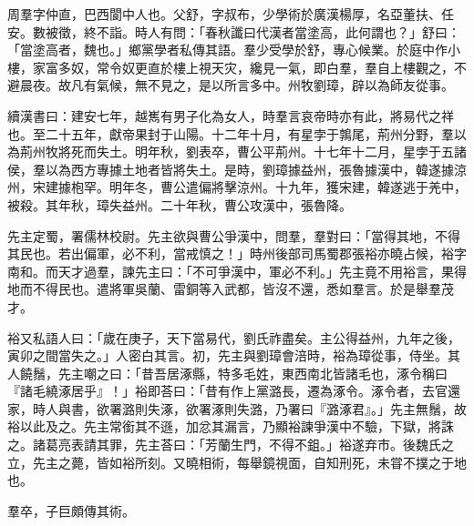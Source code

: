 
\begin{pinyinscope}
周羣字仲直，巴西閬中人也。父舒，字叔布，少學術於廣漢楊厚，名亞董扶、任安。數被徵，終不詣。時人有問：「春秋讖曰代漢者當塗高，此何謂也？」舒曰：「當塗高者，魏也。」鄉黨學者私傳其語。羣少受學於舒，專心候業。於庭中作小樓，家富多奴，常令奴更直於樓上視天灾，纔見一氣，即白羣，羣自上樓觀之，不避晨夜。故凡有氣候，無不見之，是以所言多中。州牧劉璋，辟以為師友從事。

續漢書曰：建安七年，越嶲有男子化為女人，時羣言哀帝時亦有此，將易代之祥也。至二十五年，獻帝果封于山陽。十二年十月，有星孛于鶉尾，荊州分野，羣以為荊州牧將死而失土。明年秋，劉表卒，曹公平荊州。十七年十二月，星孛于五諸侯，羣以為西方專據土地者皆將失土。是時，劉璋據益州，張魯據漢中，韓遂據涼州，宋建據枹罕。明年冬，曹公遣偏將擊涼州。十九年，獲宋建，韓遂逃于羌中，被殺。其年秋，璋失益州。二十年秋，曹公攻漢中，張魯降。

先主定蜀，署儒林校尉。先主欲與曹公爭漢中，問羣，羣對曰：「當得其地，不得其民也。若出偏軍，必不利，當戒慎之！」時州後部司馬蜀郡張裕亦曉占候，裕字南和。而天才過羣，諫先主曰：「不可爭漢中，軍必不利。」先主竟不用裕言，果得地而不得民也。遣將軍吳蘭、雷銅等入武都，皆沒不還，悉如羣言。於是舉羣茂才。

裕又私語人曰：「歲在庚子，天下當易代，劉氏祚盡矣。主公得益州，九年之後，寅卯之間當失之。」人密白其言。初，先主與劉璋會涪時，裕為璋從事，侍坐。其人饒鬚，先主嘲之曰：「昔吾居涿縣，特多毛姓，東西南北皆諸毛也，涿令稱曰『諸毛繞涿居乎』！」裕即荅曰：「昔有作上黨潞長，遷為涿令。涿令者，去官還家，時人與書，欲署潞則失涿，欲署涿則失潞，乃署曰『潞涿君』。」先主無鬚，故裕以此及之。先主常銜其不遜，加忿其漏言，乃顯裕諫爭漢中不驗，下獄，將誅之。諸葛亮表請其罪，先主荅曰：「芳蘭生門，不得不鉏。」裕遂弃市。後魏氏之立，先主之薨，皆如裕所刻。又曉相術，每舉鏡視面，自知刑死，未甞不撲之于地也。

羣卒，子巨頗傳其術。


\end{pinyinscope}